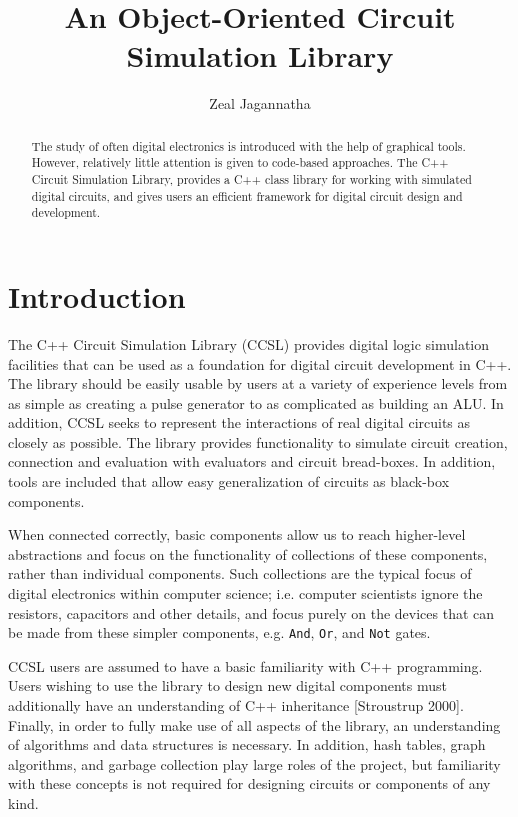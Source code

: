\documentclass{article}
\newcommand{\ClassName}[1]{\texttt{#1}}
\begin{document}

\title{An Object-Oriented Circuit Simulation Library}
\author{Zeal Jagannatha}

\maketitle

\begin{abstract}

The study of often digital electronics is introduced with the help of graphical tools. However, relatively little attention is given to code-based approaches. The C++ Circuit Simulation Library, provides a C++ class library for working with simulated digital circuits, and gives users an efficient framework for digital circuit design and development.

\end{abstract}

\section{Introduction}

The C++ Circuit Simulation Library (CCSL) provides digital logic simulation facilities that can be used as a foundation for digital circuit development in C++. The library should be easily usable by users at a variety of experience levels from as simple as creating a pulse generator to as complicated as building an ALU. In addition, CCSL seeks to represent the interactions of real digital circuits as closely as possible. The library provides functionality to simulate circuit creation, connection and evaluation with evaluators and circuit bread-boxes. In addition, tools are included that allow easy generalization of circuits as black-box components.

When connected correctly, basic components allow us to reach higher-level abstractions and focus on the functionality of collections of these components, rather than individual components. Such collections are the typical focus of digital electronics within computer science; i.e. computer scientists ignore the resistors, capacitors and other details, and focus purely on the devices that can be made from these simpler components, e.g. \ClassName{And}, \ClassName{Or}, and \ClassName{Not} gates.

CCSL users are assumed to have a basic familiarity with C++ programming. Users wishing to use the library to design new digital components must additionally have an understanding of C++ inheritance [Stroustrup 2000]. Finally, in order to fully make use of all aspects of the library, an understanding of algorithms and data structures is necessary. In addition, hash tables, graph algorithms, and garbage collection play large roles of the project, but familiarity with these concepts is not required for designing circuits or components of any kind.
\end{document}
